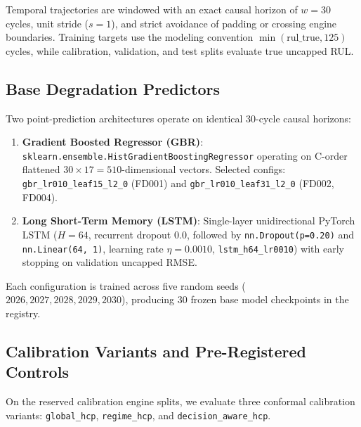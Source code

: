 Temporal trajectories are windowed with an exact causal horizon of $w=30$ cycles, unit stride ($s=1$), and strict avoidance of padding or crossing engine boundaries. Training targets use the modeling convention $\min(\text{rul\_true}, 125)$ cycles, while calibration, validation, and test splits evaluate true uncapped RUL.

\subsection{Base Degradation Predictors}
Two point-prediction architectures operate on identical 30-cycle causal horizons:
\begin{enumerate}
    \item \textbf{Gradient Boosted Regressor (GBR)}: \texttt{sklearn.ensemble.HistGradientBoostingRegressor} operating on C-order flattened $30 \times 17 = 510$-dimensional vectors. Selected configs: \texttt{gbr\_lr010\_leaf15\_l2\_0} (FD001) and \texttt{gbr\_lr010\_leaf31\_l2\_0} (FD002, FD004).
    \item \textbf{Long Short-Term Memory (LSTM)}: Single-layer unidirectional PyTorch LSTM ($H=64$, recurrent dropout $0.0$, followed by \texttt{nn.Dropout(p=0.20)} and \texttt{nn.Linear(64, 1)}, learning rate $\eta=0.0010$, \texttt{lstm\_h64\_lr0010}) with early stopping on validation uncapped RMSE.
\end{enumerate}
Each configuration is trained across five random seeds ($2026, 2027, 2028, 2029, 2030$), producing 30 frozen base model checkpoints in the registry.

\subsection{Calibration Variants and Pre-Registered Controls}
On the reserved calibration engine splits, we evaluate three conformal calibration variants: \texttt{global\_hcp}, \texttt{regime\_hcp}, and \texttt{decision\_aware\_hcp}.

